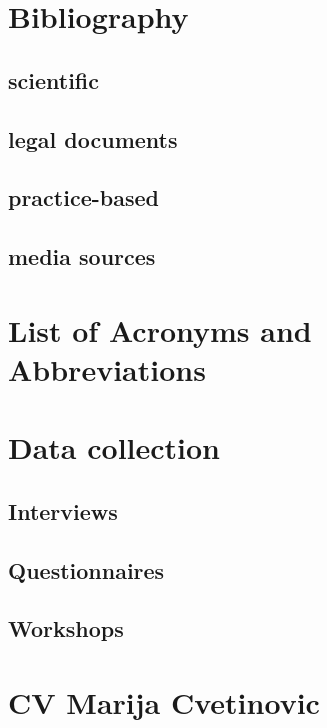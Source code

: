 \documentclass[11pt]{report}
\begin{document}
\newpage
\chapter*{Bibliography}

\begin{small}

\end{small}

\section{scientific}
\section{legal documents}
\section{practice-based}
\section{media sources}

\newpage
\chapter{List of Acronyms and Abbreviations}

\newpage
\appendix
\chapter{Data collection}

\section{Interviews}
\section{Questionnaires}
\section{Workshops}

\newpage
\chapter{CV Marija Cvetinovic}






\newpage
\appendix
\noappendicestocpagenum
\addappheadtotoc
\end{document}
